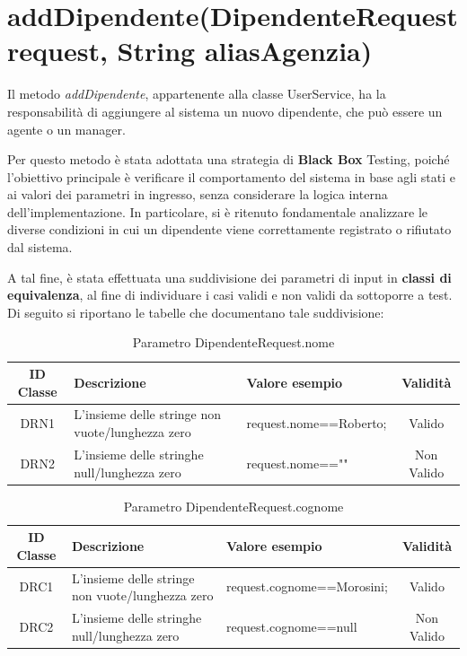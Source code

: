 \section{addDipendente(DipendenteRequest request, String aliasAgenzia)}

Il metodo \textit{addDipendente}, appartenente alla classe UserService, ha la responsabilità di aggiungere al sistema un nuovo dipendente, che può essere un agente o un manager.

Per questo metodo è stata adottata una strategia di\textbf{ Black Box} Testing, poiché l’obiettivo principale è verificare il comportamento del sistema in base agli stati e ai valori dei parametri in ingresso, senza considerare la logica interna dell’implementazione. In particolare, si è ritenuto fondamentale analizzare le diverse condizioni in cui un dipendente viene correttamente registrato o rifiutato dal sistema.

A tal fine, è stata effettuata una suddivisione dei parametri di input in \textbf{classi di equivalenza}, al fine di individuare i casi validi e non validi da sottoporre a test. Di seguito si riportano le tabelle che documentano tale suddivisione:

\begin{table}[H]
	\centering
	\begin{tabular}{|c|p{4cm}|p{5cm}|c|} 
		\hline
		\textbf{ID Classe} & \textbf{Descrizione} & \textbf{Valore esempio} & \textbf{Validità} \\
		\hline
		DRN1 & L'insieme delle stringe non vuote/lunghezza zero
		& request.nome==Roberto; & Valido \\
		\hline
		DRN2 & L'insieme delle stringhe null/lunghezza zero
		& request.nome=="" & Non Valido \\
		\hline
	\end{tabular}
	\caption{Parametro DipendenteRequest.nome}
	\label{tab:placeholder}
\end{table}

\begin{table}[H]
	\centering
	\begin{tabular}{|c|p{6cm}|p{5cm}|c|} 
		\hline
		\textbf{ID Classe} & \textbf{Descrizione} & \textbf{Valore esempio} & \textbf{Validità} \\
		\hline
		DRC1 & L'insieme delle stringe non vuote/lunghezza zero
		& request.cognome==Morosini; & Valido \\
		\hline
		DRC2 & L'insieme delle stringhe null/lunghezza zero
		& request.cognome==null & Non Valido \\
		\hline
	\end{tabular}
	\caption{Parametro DipendenteRequest.cognome}
	\label{tab:placeholder}
\end{table}

